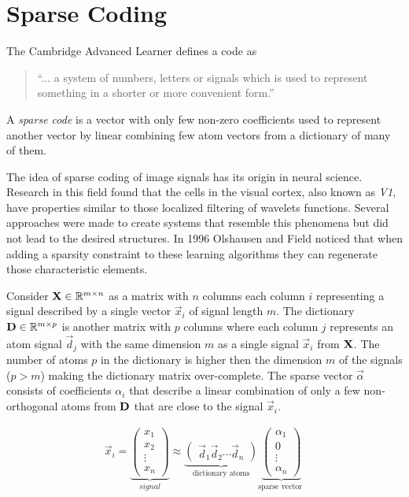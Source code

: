 \chapter{Sparse Coding}
\label{chap:sparse_coding}

The Cambridge Advanced Learner defines a code as
\begin{quotation}
``... a system of numbers, letters or signals which is used to represent
something in a shorter or more convenient form.''
\end{quotation}
A \emph{sparse code} is a vector with only few non-zero coefficients
used to represent another vector by linear combining few atom vectors from a
dictionary of many of them.

The idea of sparse coding of image signals has its origin in neural science. 
Research in this field found that the cells in the visual cortex, also known as
\emph{V1}, have properties similar to those localized filtering of wavelets
functions. Several approaches were made to create systems that resemble this
phenomena but did not lead to the desired structures. In 1996 Olshausen and
Field\cite{Olshausen1996} noticed that when adding a sparsity constraint to
these learning algorithms they can regenerate those characteristic elements.

\newpage 
Consider $\boldsymbol{\mathrm{X}} \in \mathbb{R}^{m\times n}$  as a matrix with $n$ columns each
column $i$ representing a signal described by a single vector $\vec{x}_{i}$ of
signal length $m$. The dictionary $\boldsymbol{\mathrm{D}}\in\mathbb{R}^{m \times p}$ is another
matrix with $p$ columns where each column $j$ represents an atom signal
$\vec{d}_j$ with the same dimension $m$ as a single signal $\vec{x}_{i}$ from
$\boldsymbol{\mathrm{X}}$. The number of atoms $p$ in the dictionary is higher then the
dimension $m$ of the signals ($p > m$) making the dictionary
matrix over-complete. The sparse vector $\vec{\alpha}$ consists of coefficients
$\alpha_i$ that describe a linear combination of only a few non-orthogonal
atoms from $\boldsymbol{\mathrm{D}}$ that are close to the signal $\vec{x}_i$. 

\begin{align*}
\vec{x}_i = \underbrace{\begin{pmatrix} x_1 \\ x_2 \\ \vdots \\ x_n
\end{pmatrix}}_{signal}
\approx \underbrace{\begin{pmatrix} \vec{d}_1  \vec{d}_2 \cdots \vec{d}_n
\end{pmatrix}}_{\textrm{dictionary atoms}}
\underbrace{\begin{pmatrix} \alpha_1 \\ 0 \\ \vdots \\ \alpha_n
\end{pmatrix}}_{\textrm{sparse vector }}
\end{align*}

